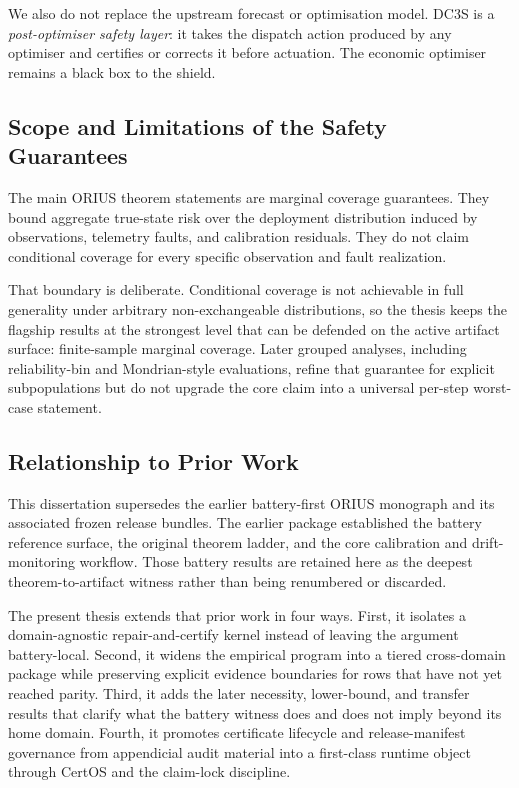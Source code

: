 We also do not replace the upstream forecast or optimisation model.  DC3S
is a \emph{post-optimiser safety layer}: it takes the dispatch action
produced by any optimiser and certifies or corrects it before actuation.
The economic optimiser remains a black box to the shield.

\subsection{Scope and Limitations of the Safety Guarantees}

The main ORIUS theorem statements are marginal coverage guarantees.  They
bound aggregate true-state risk over the deployment distribution induced by
observations, telemetry faults, and calibration residuals.  They do not claim
conditional coverage for every specific observation and fault realization.

That boundary is deliberate.  Conditional coverage is not achievable in full
generality under arbitrary non-exchangeable distributions, so the thesis keeps
the flagship results at the strongest level that can be defended on the active
artifact surface: finite-sample marginal coverage.  Later grouped analyses,
including reliability-bin and Mondrian-style evaluations, refine that
guarantee for explicit subpopulations but do not upgrade the core claim into a
universal per-step worst-case statement.

\subsection{Relationship to Prior Work}

This dissertation supersedes the earlier battery-first ORIUS monograph and its
associated frozen release bundles.  The earlier package established the
battery reference surface, the original theorem ladder, and the core
calibration and drift-monitoring workflow.  Those battery results are retained
here as the deepest theorem-to-artifact witness rather than being renumbered
or discarded.

The present thesis extends that prior work in four ways.  First, it isolates a
domain-agnostic repair-and-certify kernel instead of leaving the argument
battery-local.  Second, it widens the empirical program into a tiered
cross-domain package while preserving explicit evidence boundaries for rows
that have not yet reached parity.  Third, it adds the later necessity,
lower-bound, and transfer results that clarify what the battery witness does
and does not imply beyond its home domain.  Fourth, it promotes certificate
lifecycle and release-manifest governance from appendicial audit material into
a first-class runtime object through CertOS and the claim-lock discipline.

